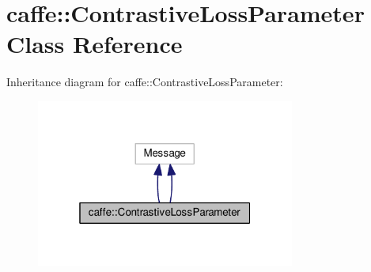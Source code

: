 \hypertarget{classcaffe_1_1_contrastive_loss_parameter}{}\section{caffe\+:\+:Contrastive\+Loss\+Parameter Class Reference}
\label{classcaffe_1_1_contrastive_loss_parameter}


Inheritance diagram for caffe\+:\+:Contrastive\+Loss\+Parameter\+:
\nopagebreak
\begin{figure}[H]
\begin{center}
\leavevmode
\includegraphics[width=241pt]{classcaffe_1_1_contrastive_loss_parameter__inherit__graph}
\end{center}
\end{figure}
